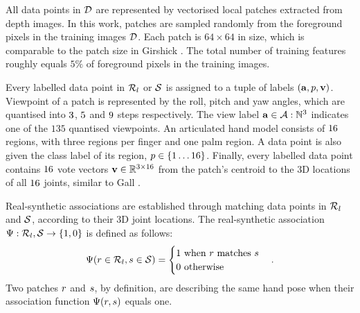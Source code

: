 All data points in $\mathcal{D}$ are represented by vectorised local patches extracted from depth images. In this work, patches are sampled randomly from the foreground pixels in the training images $\mathcal{D}$. Each patch is $64 \times 64$ in size, which is comparable to the patch size in Girshick \etal \cite{Girshick2011}. The total number of training features roughly equals $5\%$ of foreground pixels in the training images. 

Every labelled data point in $\mathcal{R}_{l}$ or $\mathcal{S}$ is assigned to a tuple of labels $(\mathbf{a}, p, \mathbf{v})$. 
Viewpoint of a patch is represented by the roll, pitch and yaw angles, which are quantised into $3$, $5$ and $9$ steps respectively. The view label $\mathbf{a} \in \mathcal{A}:\mathbb{N}^{3}$ indicates one of the $135$ quantised viewpoints.
An articulated hand model consists of $16$ regions, with three regions per finger and one palm region. A data point is also given the class label of its region, $p \in \{1\dots16\}$.   
Finally, every labelled data point contains $16$ vote vectors $\mathbf{v} \in \mathbb{R}^{3\times16}$ from the patch's centroid to the 3D locations of all $16$ joints, similar to Gall \etal \cite{Gall2011}. 

Real-synthetic associations are established through matching data points in $\mathcal{R}_{l}$ and $\mathcal{S}$, according to their 3D joint locations.  The real-synthetic association $\mathrm{\Psi}: \mathcal{R}_{l},\mathcal{S} \rightarrow \{1,0\}$ is defined as follows:
\begin{equation}
	\mathrm{\Psi}(r \in \mathcal{R}_{l}, s \in \mathcal{S}) =
		\begin{cases}
			1 \mbox{ when $r$ matches $s$} \\
			0 \mbox{ otherwise}
		\end{cases}.
	\label{eq:association}
\end{equation}
Two patches $r$ and $s$, by definition, are describing the same hand pose when their association function $\mathrm{\Psi}(r, s)$ equals one.  

